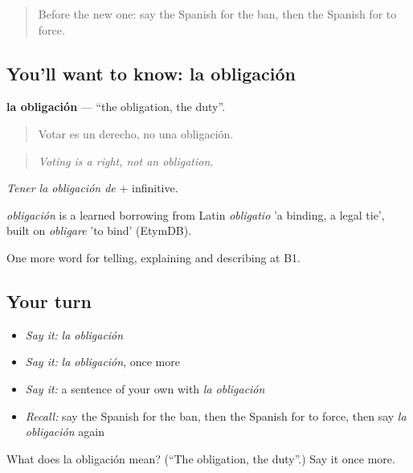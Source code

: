 \label{lesson:ES-C622-obligacion}



\begin{quote}
Before the new one: say the Spanish for the ban, then the Spanish for to force.
\end{quote}

\subsection*{You'll want to know: la obligación}
\textbf{la obligación} — \textquotedblleft{}the obligation, the duty\textquotedblright{}.

\begin{quote}
Votar es un derecho, no una obligación.
\end{quote}

\begin{quote}
\emph{Voting is a right, not an obligation.}
\end{quote}

\emph{Tener la obligación de} + infinitive.

\begin{cousinweb}
\emph{obligación} is a learned borrowing from Latin \emph{obligatio} 'a binding, a legal tie', built on \emph{obligare} 'to bind' (EtymDB).
\end{cousinweb}

\begin{grammarlens}[title={What you've built}]
One more word for telling, explaining and describing at B1.
\end{grammarlens}

\subsection*{Your turn}
\begin{itemize}
\raggedright
  \item \emph{Say it:} \emph{la obligación}
  \item \emph{Say it:} \emph{la obligación}, once more
  \item \emph{Say it:} a sentence of your own with \emph{la obligación}
  \item \emph{Recall:} say the Spanish for the ban, then the Spanish for to force, then say \emph{la obligación} again
\end{itemize}

\begin{tcolorbox}[breakable,colback=teal!4,colframe=teal!35!black,title={Before you move on}]
What does la obligación mean? (\textquotedblleft{}The obligation, the duty\textquotedblright{}.) Say it once more.
\end{tcolorbox}
